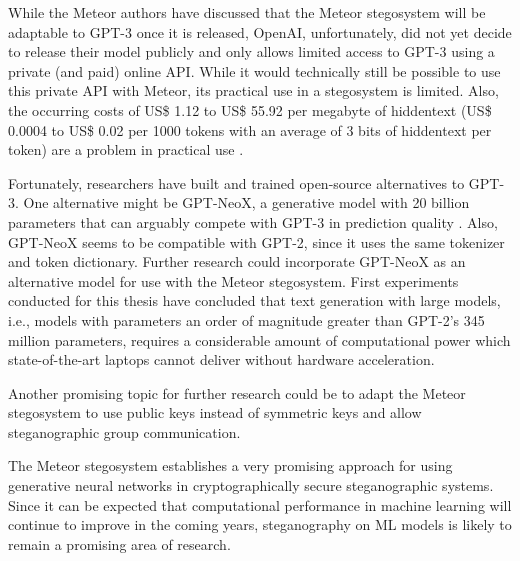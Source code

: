 While the Meteor authors have discussed that the Meteor stegosystem will be adaptable to GPT-3 once it is released, OpenAI, unfortunately, did not yet decide to release their model publicly and only allows limited access to GPT-3 using a private (and paid) online API.
While it would technically still be possible to use this private API with Meteor, its practical use in a stegosystem is limited.
Also, the occurring costs of US\$ 1.12 to US\$ 55.92 per megabyte of hiddentext (US\$ 0.0004 to US\$ 0.02 per 1000 tokens with an average of 3 bits of hiddentext per token) are a problem in practical use \cite{OpenAIPricing2022}.

Fortunately, researchers have built and trained open-source alternatives to GPT-3.
One alternative might be GPT-NeoX, a generative model with 20 billion parameters that can arguably compete with GPT-3 in prediction quality \cite{GPTneo2022}.
Also, GPT-NeoX seems to be compatible with GPT-2, since it uses the same tokenizer and token dictionary.
Further research could incorporate GPT-NeoX as an alternative model for use with the Meteor stegosystem.
First experiments conducted for this thesis have concluded that text generation with large models, i.e., models with parameters an order of magnitude greater than GPT-2's 345 million parameters, requires a considerable amount of computational power which state-of-the-art laptops cannot deliver without hardware acceleration.

Another promising topic for further research could be to adapt the Meteor stegosystem to use public keys instead of symmetric keys and allow steganographic group communication.

The Meteor stegosystem establishes a very promising approach for using generative neural networks in cryptographically secure steganographic systems.
Since it can be expected that computational performance in machine learning will continue to improve in the coming years, steganography on ML models is likely to remain a promising area of research.
